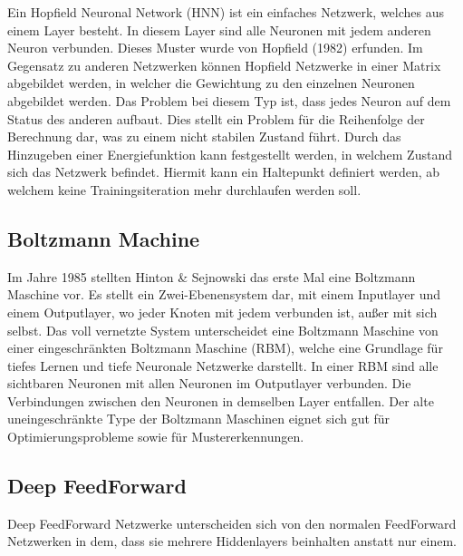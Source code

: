 Ein Hopfield Neuronal Network (HNN) \cite{demuth2014neural} ist ein einfaches Netzwerk, welches aus einem Layer besteht. 
In diesem Layer sind alle Neuronen mit jedem anderen Neuron verbunden. 
Dieses Muster wurde von Hopfield (1982) erfunden. 
Im Gegensatz zu anderen Netzwerken können Hopfield Netzwerke in einer Matrix abgebildet werden, in welcher die Gewichtung zu den einzelnen Neuronen abgebildet werden. 
Das Problem bei diesem Typ ist, dass jedes Neuron auf dem Status des anderen aufbaut.
Dies stellt ein Problem für die Reihenfolge der Berechnung dar, was zu einem nicht stabilen Zustand führt.
Durch das Hinzugeben einer Energiefunktion kann festgestellt werden, in welchem Zustand sich das Netzwerk befindet. 
Hiermit kann ein Haltepunkt definiert werden, ab welchem keine Trainingsiteration mehr durchlaufen werden soll. 

\subsection{Boltzmann Machine}

Im Jahre 1985 stellten Hinton \& Sejnowski \cite{Hinton:Boltzman:2007} das erste Mal eine Boltzmann Maschine vor.
Es stellt ein Zwei-Ebenensystem dar, mit einem Inputlayer und einem Outputlayer, wo jeder Knoten mit jedem verbunden ist, außer mit sich selbst.
Das voll vernetzte System unterscheidet eine Boltzmann Maschine von einer eingeschränkten Boltzmann Maschine (RBM), welche eine Grundlage für tiefes Lernen und tiefe Neuronale Netzwerke darstellt.
In einer RBM sind alle sichtbaren Neuronen mit allen Neuronen im Outputlayer verbunden. 
Die Verbindungen zwischen den Neuronen in demselben Layer entfallen.
Der alte uneingeschränkte Type der Boltzmann Maschinen eignet sich gut für Optimierungsprobleme sowie für Mustererkennungen.


\subsection{Deep FeedForward}
\label{subsec:DeepFeedForward}

Deep FeedForward Netzwerke unterscheiden sich von den normalen FeedForward Netzwerken in dem, dass sie mehrere Hiddenlayers beinhalten anstatt nur einem.

